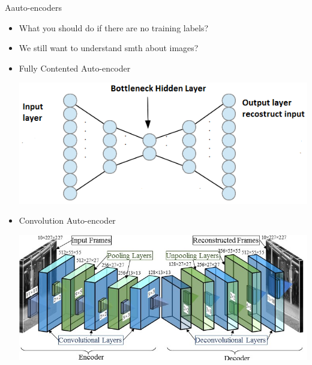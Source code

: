 \documentclass{beamer}
\begin{document}
\begin{frame}{Aauto-encoders}
	
	\begin{itemize}
		\item   What you should do if there are no training labels?
		\item   We still want to understand smth about images?
		\item   Fully Contented Auto-encoder
			\begin{center}
				\includegraphics[scale=0.5]{img/autoencoders.png}
			\end{center} 
								
		\item    Convolution Auto-encoder
			\begin{center}
				\includegraphics[scale=0.3]{img/cautoenc}
			\end{center} 
	\end{itemize}

\end{frame}
\end{document}

